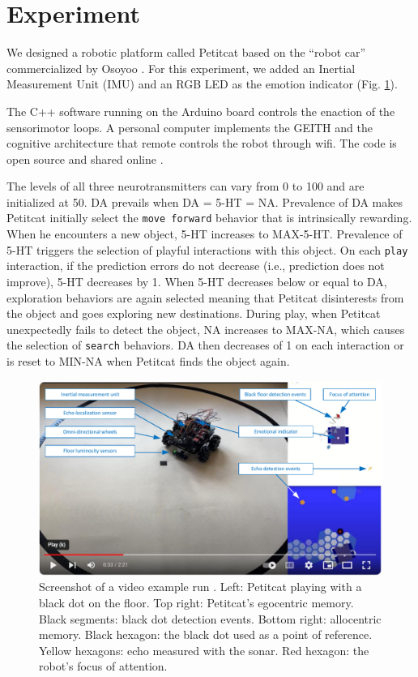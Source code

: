 \documentclass[runningheads]{llncs}
\begin{document}
\section{Experiment}

We designed a robotic platform called Petitcat based on the ``robot car'' commercialized by Osoyoo \cite{osoyoo_robot_car}.
For this experiment, we added an Inertial Measurement Unit (IMU) and an RGB LED as the emotion indicator (Fig. \ref{fig:video}). 

The C++ software running on the Arduino board controls the enaction of the sensorimotor loops. 
A personal computer implements the GEITH and the cognitive architecture that remote controls the robot through wifi.
The code is open source and shared online \cite{petitcat_github}.

The levels of all three neurotransmitters can vary from 0 to 100 and are initialized at 50. DA prevails when DA = 5-HT = NA.
Prevalence of DA makes Petitcat initially select the \texttt{move forward} behavior that is intrinsically rewarding.
When he encounters a new object, 5-HT increases to MAX-5-HT. Prevalence of 5-HT triggers the selection of playful interactions with this object.
On each  \texttt{play} interaction, if the prediction errors do not decrease (i.e., prediction does not improve), 5-HT decreases by 1.
When 5-HT decreases below or equal to DA, exploration behaviors are again selected meaning that Petitcat disinterests from the object and goes exploring new destinations. 
During play, when Petitcat unexpectedly fails to detect the object, NA increases to MAX-NA, which causes the selection of \texttt{search} behaviors. 
DA then decreases of 1 on each interaction or is reset to MIN-NA when Petitcat finds the object again.  


\begin{figure}
	\includegraphics[width=\textwidth]{Figure_video.pdf}
	\caption{Screenshot of a video example run \cite{georgeon_petitcat_2024}.
	Left: Petitcat playing with a black dot on the floor.
	Top right: Petitcat's egocentric memory. Black segments: black dot detection events. 
	Bottom right: allocentric memory. Black hexagon: the black dot used as a point of reference. Yellow hexagons: echo measured with the sonar. Red hexagon: the robot's focus of attention.} \label{fig:video}
\end{figure}
\end{document}
